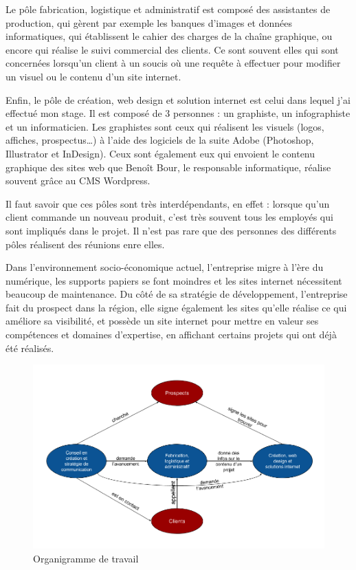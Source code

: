\documentclass[report]{tnreport}
\begin{document}
Le pôle fabrication, logistique et administratif est composé des assistantes de production, qui gèrent par exemple les banques d’images et données informatiques, qui établissent le cahier des charges de la chaîne graphique, ou encore qui réalise le suivi commercial des clients. Ce sont souvent elles qui sont concernées lorsqu’un client à un soucis où une requête à effectuer pour modifier un visuel ou le contenu d'un site internet.


Enfin, le pôle de création, web design et solution internet est celui dans lequel j’ai effectué mon stage. Il est composé de 3 personnes : un graphiste, un infographiste et un informaticien. Les graphistes sont ceux qui réalisent les visuels (logos, affiches, prospectus…) à l’aide des logiciels de la suite Adobe (Photoshop, Illustrator et InDesign). Ceux sont également eux qui envoient le contenu graphique des sites web que Benoît Bour, le responsable informatique, réalise souvent grâce au CMS Wordpress.


Il faut savoir que ces pôles sont très interdépendants, en effet : lorsque qu’un client commande un nouveau produit, c’est très souvent tous les employés qui sont impliqués dans le projet. Il n’est pas rare que des personnes des différents pôles réalisent des réunions enre elles.


Dans l'environnement socio-économique actuel, l’entreprise migre à l’ère du numérique, les supports papiers se font moindres et les sites internet nécessitent beaucoup de maintenance. Du côté de sa stratégie de développement, l’entreprise fait du prospect dans la région, elle signe également les sites qu’elle réalise ce qui améliore sa visibilité, et possède un site internet pour mettre en valeur ses compétences et domaines d'expertise, en affichant certains projets qui ont déjà été réalisés. 

\begin{figure}[h]
  \centering
  \includegraphics[width=16cm]{figures/Organigramme}
  \caption{Organigramme de travail}
  
  \label{fig:organigramme}
\end{figure}
\end{document}
